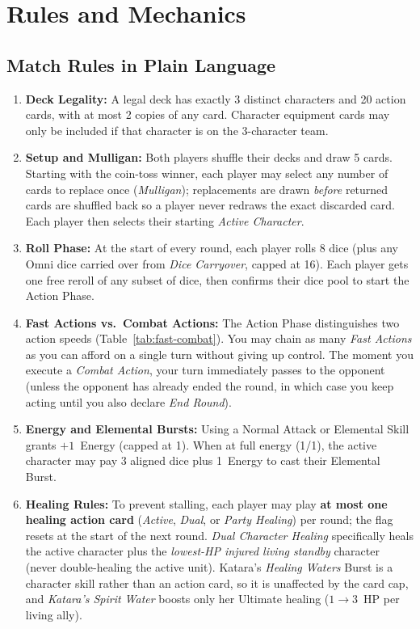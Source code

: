 \documentclass[11pt,a4paper]{article}
\begin{document}
\section{Rules and Mechanics}

\subsection{Match Rules in Plain Language}

\begin{enumerate}[leftmargin=1.4em, itemsep=2.5pt]
  \item \textbf{Deck Legality:} A legal deck has exactly 3 distinct characters and 20 action cards, with at most 2 copies of any card. Character equipment cards may only be included if that character is on the 3-character team.
  \item \textbf{Setup and Mulligan:} Both players shuffle their decks and draw 5 cards. Starting with the coin-toss winner, each player may select any number of cards to replace once (\emph{Mulligan}); replacements are drawn \emph{before} returned cards are shuffled back so a player never redraws the exact discarded card. Each player then selects their starting \emph{Active Character}.
  \item \textbf{Roll Phase:} At the start of every round, each player rolls 8 dice (plus any Omni dice carried over from \emph{Dice Carryover}, capped at 16). Each player gets one free reroll of any subset of dice, then confirms their dice pool to start the Action Phase.
  \item \textbf{Fast Actions vs.\ Combat Actions:} The Action Phase distinguishes two action speeds (Table~\ref{tab:fast-combat}). You may chain as many \emph{Fast Actions} as you can afford on a single turn without giving up control. The moment you execute a \emph{Combat Action}, your turn immediately passes to the opponent (unless the opponent has already ended the round, in which case you keep acting until you also declare \emph{End Round}).
  \item \textbf{Energy and Elemental Bursts:} Using a Normal Attack or Elemental Skill grants $+1$~Energy (capped at 1). When at full energy (1/1), the active character may pay 3 aligned dice plus 1~Energy to cast their Elemental Burst.
  \item \textbf{Healing Rules:} To prevent stalling, each player may play \textbf{at most one healing action card} (\emph{Active}, \emph{Dual}, or \emph{Party Healing}) per round; the flag resets at the start of the next round. \emph{Dual Character Healing} specifically heals the active character plus the \emph{lowest-HP injured living standby} character (never double-healing the active unit). Katara's \emph{Healing Waters} Burst is a character skill rather than an action card, so it is unaffected by the card cap, and \emph{Katara's Spirit Water} boosts only her Ultimate healing ($1 \to 3$~HP per living ally).

\end{enumerate}
\end{document}
